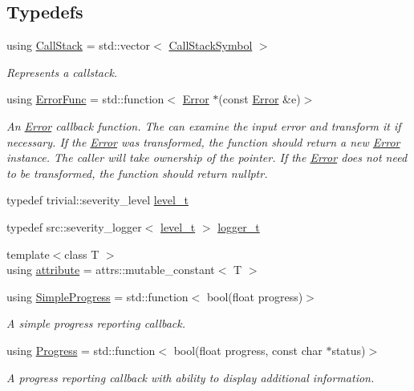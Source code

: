\subsection*{Typedefs}
\begin{DoxyCompactItemize}
\item 
using \hyperlink{group___utility_module_gabdf2d70ae3aab3c57142eddec69a725c}{Call\+Stack} = std\+::vector$<$ \hyperlink{structdg_1_1deepcore_1_1_call_stack_symbol}{Call\+Stack\+Symbol} $>$
\begin{DoxyCompactList}\small\item\em Represents a callstack. \end{DoxyCompactList}\item 
using \hyperlink{group___utility_module_gaa93ea71a4ed4c044369d3b323aec4435}{Error\+Func} = std\+::function$<$ \hyperlink{classdg_1_1deepcore_1_1_error}{Error} $\ast$(const \hyperlink{classdg_1_1deepcore_1_1_error}{Error} \&e)$>$
\begin{DoxyCompactList}\small\item\em An \hyperlink{classdg_1_1deepcore_1_1_error}{Error} callback function. The can examine the input error and transform it if necessary. If the \hyperlink{classdg_1_1deepcore_1_1_error}{Error} was transformed, the function should return a new \hyperlink{classdg_1_1deepcore_1_1_error}{Error} instance. The caller will take ownership of the pointer. If the \hyperlink{classdg_1_1deepcore_1_1_error}{Error} does not need to be transformed, the function should return nullptr. \end{DoxyCompactList}\item 
typedef trivial\+::severity\+\_\+level \hyperlink{namespacedg_1_1deepcore_ac108b40b3a6b8e3450281eb787e27d6b}{level\+\_\+t}
\item 
typedef src\+::severity\+\_\+logger$<$ \hyperlink{namespacedg_1_1deepcore_ac108b40b3a6b8e3450281eb787e27d6b}{level\+\_\+t} $>$ \hyperlink{namespacedg_1_1deepcore_acaeda2fb8a475fd1de2ef14ac9ec7a2f}{logger\+\_\+t}
\item 
{\footnotesize template$<$class T $>$ }\\using \hyperlink{namespacedg_1_1deepcore_abfee748fb46325389237ecd4d1d7f21b}{attribute} = attrs\+::mutable\+\_\+constant$<$ T $>$
\item 
using \hyperlink{group___utility_module_ga6763018df79e4bdbcd8cd14cea5342b2}{Simple\+Progress} = std\+::function$<$ bool(float progress)$>$
\begin{DoxyCompactList}\small\item\em A simple progress reporting callback. \end{DoxyCompactList}\item 
using \hyperlink{group___utility_module_gae07fce8a40a5222a0dcd537a0b28a008}{Progress} = std\+::function$<$ bool(float progress, const char $\ast$status)$>$
\begin{DoxyCompactList}\small\item\em A progress reporting callback with ability to display additional information. \end{DoxyCompactList}\end{DoxyCompactItemize}
